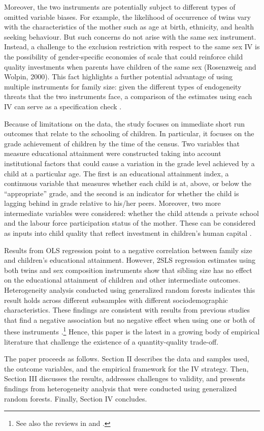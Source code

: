 Moreover, the two instruments are potentially subject to different types of omitted variable biases. For example, the likelihood of occurrence of twins vary with the characteristics of the mother such as age at birth, ethnicity, and health seeking behaviour. But such concerns do not arise with the same sex instrument. Instead, a challenge to the exclusion restriction with respect to the same sex IV is the possibility of gender-specific economies of scale that could reinforce child quality investments when parents have children of the same sex (Rosenzweig and Wolpin, 2000). This fact highlights a further potential advantage of using multiple instruments for family size: given the different types of endogeneity threats that the two instruments face, a comparison of the estimates using each IV can serve as a specification check \parencite{angrist_multiple_2010}.

Because of limitations on the data, the study focuses on immediate short run outcomes that relate to the schooling of children. In particular, it focuses on the grade achievement of children by the time of the census. Two variables that measure educational attainment were constructed taking into account institutional factors that could cause a variation in the grade level achieved by a child at a particular age. The first is an educational attainment index, a continuous variable that measures whether each child is at, above, or below the “appropriate” grade, and the second is an indicator for whether the child is lagging behind in grade relative to his/her peers. Moreover, two more intermediate variables were considered: whether the child attends a private school and the labour force participation status of the mother. These can be considered as inputs into child quality that reflect investment in children’s human capital \parencite{caceres-delpiano_impacts_2006}.

Results from OLS regression point to a negative correlation between family size and children’s educational attainment. However, 2SLS regression estimates using both twins and sex composition instruments show that sibling size has no effect on the educational attainment of children and other intermediate outcomes. Heterogeneity analysis conducted using generalized random forests \parencite{Athey2019} indicates this result holds across different subsamples with different sociodemographic characteristics. These findings are consistent with results from previous studies that find a negative association but no negative effect when using one or both of these instruments \parencite[see, for example,][]{Black2005,Black2010,caceres-delpiano_impacts_2006,angrist_multiple_2010,bhalotra_twin_2020}.\footnote{See also the reviews in \textcite{clarke_children_2018} and \textcite{oberg_casual_2021}.} Hence, this paper is the latest in a growing body of empirical literature that challenge the existence of a quantity-quality trade-off.

The paper proceeds as follows. Section II describes the data and samples used, the outcome variables, and the empirical framework for the IV strategy. Then, Section III discusses the results, addresses challenges to validity, and presents findings from heterogeneity analysis that were conducted using generalized random forests. Finally, Section IV concludes.
